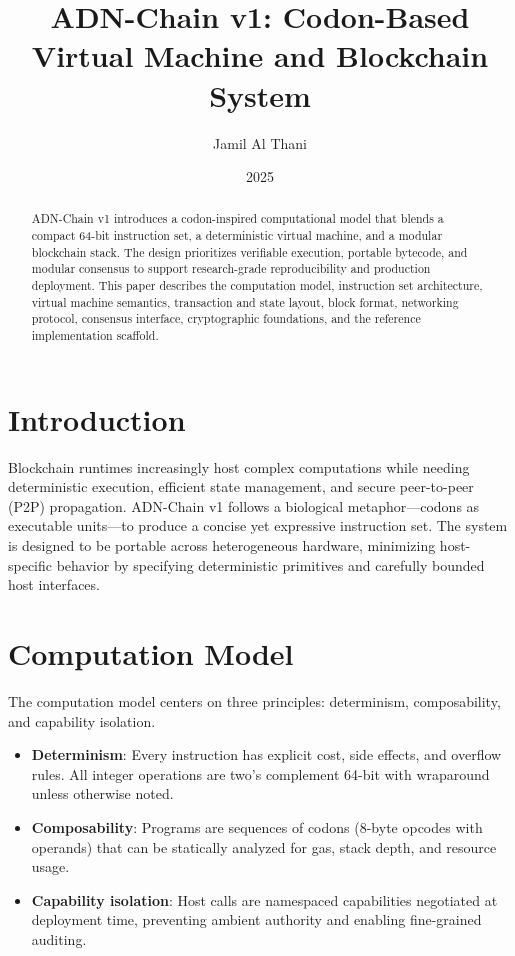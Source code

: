 \documentclass[11pt]{article}
\title{ADN-Chain v1: Codon-Based Virtual Machine and Blockchain System}
\author{Jamil Al Thani}
\date{2025}
\begin{document}
\maketitle

\begin{abstract}
ADN-Chain v1 introduces a codon-inspired computational model that blends a compact 64-bit instruction set, a deterministic virtual machine, and a modular blockchain stack. The design prioritizes verifiable execution, portable bytecode, and modular consensus to support research-grade reproducibility and production deployment. This paper describes the computation model, instruction set architecture, virtual machine semantics, transaction and state layout, block format, networking protocol, consensus interface, cryptographic foundations, and the reference implementation scaffold.
\end{abstract}

\section{Introduction}
Blockchain runtimes increasingly host complex computations while needing deterministic execution, efficient state management, and secure peer-to-peer (P2P) propagation. ADN-Chain v1 follows a biological metaphor---codons as executable units---to produce a concise yet expressive instruction set. The system is designed to be portable across heterogeneous hardware, minimizing host-specific behavior by specifying deterministic primitives and carefully bounded host interfaces.

\section{Computation Model}
The computation model centers on three principles: determinism, composability, and capability isolation.
\begin{itemize}[noitemsep]
  \item \textbf{Determinism}: Every instruction has explicit cost, side effects, and overflow rules. All integer operations are two's complement 64-bit with wraparound unless otherwise noted.
  \item \textbf{Composability}: Programs are sequences of codons (8-byte opcodes with operands) that can be statically analyzed for gas, stack depth, and resource usage.
  \item \textbf{Capability isolation}: Host calls are namespaced capabilities negotiated at deployment time, preventing ambient authority and enabling fine-grained auditing.
\end{itemize}
\end{document}
